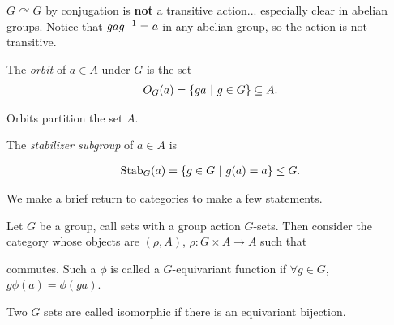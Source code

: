 \documentclass[12pt, twosided]{article}
\begin{document}
\begin{exa}
  \(G \curvearrowright G\) by conjugation is \textbf{not} a transitive action... especially clear in abelian groups. Notice that \(gag^{-1} = a\) in any abelian group, so the action is not transitive.
\end{exa}

\begin{df}
  The \textit{orbit} of \(a \in A\) under \(G\) is the set 
  \begin{align*}
    O_G(a) = \left\{ ga \ \middle\vert\  g\in G \right\} \subseteq A.
  \end{align*}
\end{df}

Orbits partition the set \(A\).

\begin{df}
  The \textit{stabilizer subgroup} of \(a \in A\) is

  \begin{align*}
    \mathrm{Stab}_G(a) = \left\{ g \in G \ \middle\vert\  g(a) = a \right\} \leq G.
  \end{align*}
\end{df}

We make a brief return to categories to make a few statements.

Let \(G\) be a group, call sets with a group action \(G\)-sets. Then consider the category whose objects are \((\rho, A)\), \(\rho: G \times A \to A\) such that


\begin{center}
\end{center}
commutes. Such a \(\phi\) is called a \(G\)-equivariant function  if \(\forall g \in G\), \(g\phi(a) = \phi(ga)\).

Two \(G\) sets are called isomorphic if there is an equivariant bijection.
\end{document}
